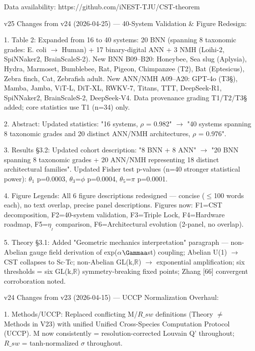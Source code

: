 \documentclass[a4paper,12pt]{article}
\begin{document}
Data availability: https://github.com/iNEST-TJU/CST-theorem

v25 Changes from v24 (2026-04-25) --- 40-System Validation \& Figure Redesign:

1. Table 2: Expanded from 16 to 40 systems: 20 BNN (spanning 8 taxonomic grades: E. coli $\rightarrow$ Human) + 17 binary-digital ANN + 3 NMH (Loihi-2, SpiNNaker2, BrainScaleS-2). New BNN B09--B20: Honeybee, Sea slug (Aplysia), Hydra, Marmoset, Bumblebee, Rat, Pigeon, Chimpanzee (T2\dag), Bat (Eptesicus), Zebra finch, Cat, Zebrafish adult. New ANN/NMH A09--A20: GPT-4o (T3\S{}), Mamba, Jamba, ViT-L, DiT-XL, RWKV-7, Titans, TTT, DeepSeek-R1, SpiNNaker2, BrainScaleS-2, DeepSeek-V4. Data provenance grading T1/T2\dag/T3\S{} added; core statistics use T1 (n=34) only.

2. Abstract: Updated statistics: "16 systems, $\rho$ = 0.982" $\rightarrow$ "40 systems spanning 8 taxonomic grades and 20 distinct ANN/NMH architectures, $\rho$ = 0.976".

3. Results \S{}3.2: Updated cohort description: "8 BNN + 8 ANN" $\rightarrow$ "20 BNN spanning 8 taxonomic grades + 20 ANN/NMH representing 18 distinct architectural families". Updated Fisher test p-values (n=40 stronger statistical power): $\theta$$_1$ p=0.0003, $\theta$$_3$=$\phi$ p=0.0004, $\theta$$_5$=$\pi$ p=0.0001.

4. Figure Legends: All 6 figure descriptions redesigned --- concise ($\leq$100 words each), no text overlap, precise panel descriptions. Figures now: F1=CST decomposition, F2=40-system validation, F3=Triple Lock, F4=Hardware roadmap, F5=$\eta_{_I}$ comparison, F6=Architectural evolution (2-panel, no overlap).

5. Theory \S{}3.1: Added "Geometric mechanics interpretation" paragraph --- non-Abelian gauge field derivation of exp($\alpha$\cdot$\Gammaa$st) coupling; Abelian U(1) $\rightarrow$ CST collapses to Sc$\cdot$Tc; non-Abelian GL(k,$\mathbb{R}$) $\rightarrow$ exponential amplification; six thresholds = six GL(k,$\mathbb{R}$) symmetry-breaking fixed points; Zhang [66] convergent corroboration noted.

v24 Changes from v23 (2026-04-15) --- UCCP Normalization Overhaul:

1. Methods/UCCP: Replaced conflicting M/$R\_{sw}$ definitions (Theory $\neq$ Methods in V23) with unified Unified Cross-Species Computation Protocol (UCCP). M now consistently = resolution-corrected Louvain Q' throughout; $R\_{sw}$ = tanh-normalized $\sigma$ throughout.
\end{document}
